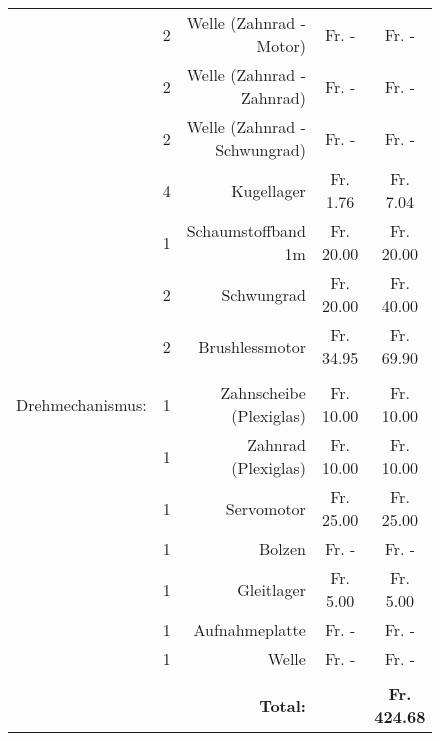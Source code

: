 \begin{figure}[h!]
\begin{tabular}{rcrcc}
          & 2     & Welle (Zahnrad - Motor) &  Fr.              -    &  Fr.             -    \\
          & 2     & Welle (Zahnrad - Zahnrad) &  Fr.              -    &  Fr.             -    \\
          & 2     & Welle (Zahnrad - Schwungrad) &  Fr.              -    &  Fr.             -    \\
          & 4     & Kugellager &  Fr.           1.76  &  Fr.          7.04  \\
          & 1     & Schaumstoffband 1m &  Fr.        20.00  &  Fr.        20.00  \\
          & 2     & Schwungrad &  Fr.        20.00  &  Fr.        40.00  \\
          & 2     & Brushlessmotor &  Fr.        34.95  &  Fr.        69.90  \\
          &       &       &       &  \\
    Drehmechanismus: & 1     & Zahnscheibe (Plexiglas) &  Fr.         10.00  &  Fr.        10.00  \\
          & 1     & Zahnrad (Plexiglas) &  Fr.         10.00  &  Fr.        10.00  \\
          & 1     & Servomotor &  Fr.        25.00  &  Fr.        25.00  \\
          & 1     & Bolzen &  Fr.              -    &  Fr.             -    \\
          & 1     & Gleitlager &  Fr.          5.00  &  Fr.          5.00  \\
          & 1     & Aufnahmeplatte &  Fr.              -    &  Fr.             -    \\
          & 1     & Welle &  Fr.              -    &  Fr.             -    \\
          &       &       &       &  \\
          &       & \textbf{Total:} & \textbf{} & \textbf{ Fr. 424.68 } \\

    \end{tabular}

\end{figure}